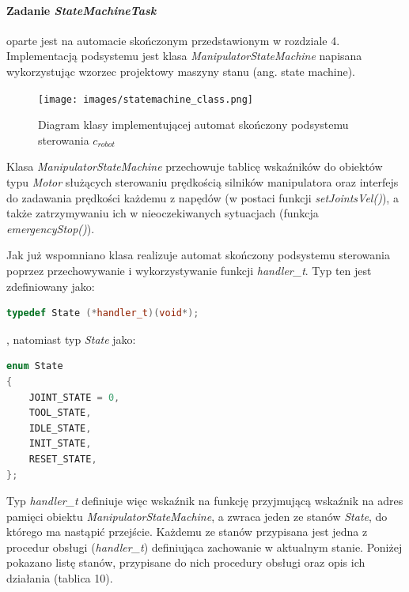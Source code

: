 \documentclass[a4paper, 12pt, twoside]{article}
\begin{document}
\paragraph{Zadanie \textit{StateMachineTask}} oparte jest na automacie skończonym przedstawionym w rozdziale 4. Implementacją podsystemu jest klasa \textit{ManipulatorStateMachine} napisana wykorzystując wzorzec projektowy maszyny stanu (ang. state machine). 

\begin{figure}[hbt!]
\centering
\texttt{[image: images/statemachine\_class.png]}
\caption{Diagram klasy implementującej automat skończony podsystemu sterowania $c_{robot}$}
\label{fig:statemachine_class}
\end{figure}

Klasa \textit{ManipulatorStateMachine} przechowuje tablicę wskaźników do obiektów typu \textit{Motor} służących sterowaniu prędkością silników manipulatora oraz interfejs do zadawania prędkości każdemu z napędów (w postaci funkcji \textit{setJointsVel()}), a także zatrzymywaniu ich w nieoczekiwanych sytuacjach (funkcja \textit{emergencyStop()}). 

Jak już wspomniano klasa realizuje automat skończony podsystemu sterowania poprzez przechowywanie i wykorzystywanie funkcji \textit{handler\_t}. Typ ten jest zdefiniowany jako:

\begin{lstlisting}[language=C++,
                   directivestyle={\color{black}}
                   emph={int,char,double,float,unsigned},
                   emphstyle={\color{blue}}
                  ]
typedef State (*handler_t)(void*);
\end{lstlisting}

, natomiast typ \textit{State} jako:

\begin{lstlisting}[language=C++,
                   directivestyle={\color{black}}
                   emph={int,char,double,float,unsigned},
                   emphstyle={\color{blue}}
                  ]
enum State
{
	JOINT_STATE = 0,
	TOOL_STATE,
	IDLE_STATE,
	INIT_STATE,
	RESET_STATE,
};
\end{lstlisting}

Typ \textit{handler\_t} definiuje więc wskaźnik na funkcję przyjmującą wskaźnik na adres pamięci obiektu \textit{ManipulatorStateMachine}, a zwraca jeden ze stanów \textit{State}, do którego ma nastąpić przejście. Każdemu ze stanów przypisana jest jedna z procedur obsługi (\textit{handler\_t}) definiująca zachowanie w aktualnym stanie. Poniżej pokazano listę stanów, przypisane do nich procedury obsługi oraz opis ich działania (tablica 10).
\end{document}
